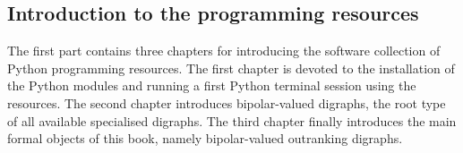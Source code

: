 % 
%
%

\begin{partbacktext}
\part{Introduction to the \Digraph programming resources}
\noindent The first part contains three chapters for introducing the \Digraph software collection of Python programming resources. The first chapter is devoted to the installation of the \Digraph Python modules and running a first Python terminal session using the  resources. The second chapter introduces bipolar-valued digraphs, the root type of all available specialised digraphs. The third chapter finally introduces the main formal objects of this book, namely bipolar-valued outranking digraphs.
\end{partbacktext}